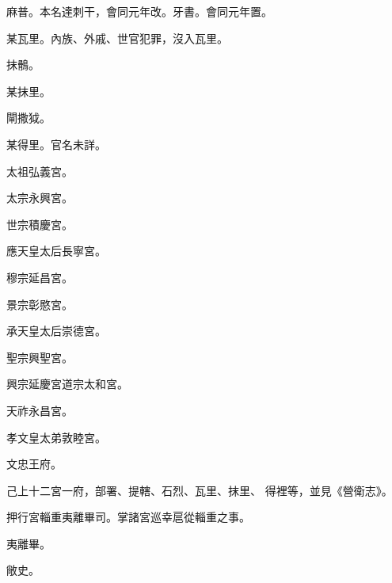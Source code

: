 \begin{pinyinscope}
 麻普。本名達刺干，會同元年改。牙書。會同元年置。



 某瓦里。內族、外戚、世官犯罪，沒入瓦里。



 抹鶻。



 某抹里。



 閘撒狘。



 某得里。官名未詳。



 太祖弘義宮。



 太宗永興宮。



 世宗積慶宮。



 應天皇太后長寧宮。



 穆宗延昌宮。



 景宗彰愍宮。



 承天皇太后崇德宮。



 聖宗興聖宮。



 興宗延慶宮道宗太和宮。



 天祚永昌宮。



 孝文皇太弟敦睦宮。



 文忠王府。



 己上十二宮一府，部署、提轄、石烈、瓦里、抹里、
 得裡等，並見《營衛志》。



 押行宮輜重夷離畢司。掌諸宮巡幸扈從輜重之事。



 夷離畢。



 敞史。



\end{pinyinscope}